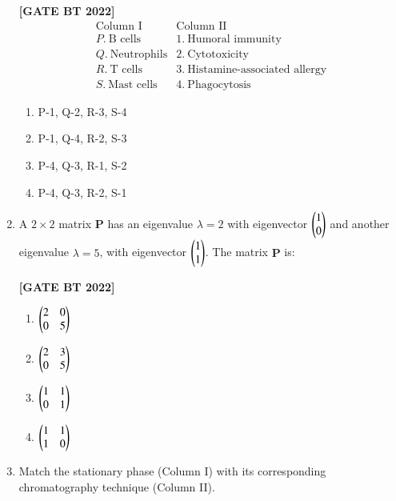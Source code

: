 \documentclass[12pt]{article}
\begin{document}
\begin{enumerate}[leftmargin=2.5em, label=\textbf{Q.\arabic*}., itemsep=2em, resume]
\noindent \textbf{[GATE BT 2022]}
\[
\begin{array}{ll}
\text{Column I} & \text{Column II} \\
P. \ \text{B cells} & 1. \ \text{Humoral immunity} \\
Q. \ \text{Neutrophils} & 2. \ \text{Cytotoxicity} \\
R. \ \text{T cells} & 3. \ \text{Histamine-associated allergy} \\
S. \ \text{Mast cells} & 4. \ \text{Phagocytosis}
\end{array}
\]
\begin{multicols}{2}
\begin{enumerate}
    \item P-1, Q-2, R-3, S-4
    \item P-1, Q-4, R-2, S-3
    \item P-4, Q-3, R-1, S-2
    \item P-4, Q-3, R-2, S-1
\end{enumerate}
\end{multicols}

\item A $2\times2$ matrix $\mathbf{P}$ has an eigenvalue $\lambda=2$ with eigenvector $\begin{pmatrix}1\\0\end{pmatrix}$ and another eigenvalue $\lambda=5$, with eigenvector $\begin{pmatrix}1\\1\end{pmatrix}$. The matrix $\mathbf{P}$ is:

\noindent \textbf{[GATE BT 2022]}
\begin{multicols}{2}
\begin{enumerate}
    \item $\begin{pmatrix}2 & 0 \\ 0 & 5\end{pmatrix}$
    \item $\begin{pmatrix}2 & 3 \\ 0 & 5\end{pmatrix}$
    \item $\begin{pmatrix}1 & 1 \\ 0 & 1\end{pmatrix}$
    \item $\begin{pmatrix}1 & 1 \\ 1 & 0\end{pmatrix}$
\end{enumerate}
\end{multicols}

\item Match the stationary phase (Column I) with its corresponding chromatography technique (Column II).


\end{enumerate}
\end{document}
